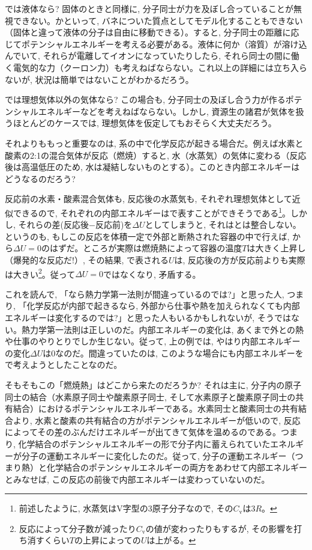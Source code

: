 では液体なら? 固体のときと同様に, 分子同士が力を及ぼし合っていることが無視できない。かといって, バネについた質点としてモデル化することもできない（固体と違って液体の分子は自由に移動できる）。すると, 分子同士の距離に応じてポテンシャルエネルギーを考える必要がある。液体に何か（溶質）が溶け込んでいて, それらが電離してイオンになっていたりしたら, それら同士の間に働く電気的な力（クーロン力）も考えねばならない。これ以上の詳細には立ち入らないが, 状況は簡単ではないことがわかるだろう。
\mv

では理想気体以外の気体なら? この場合も, 分子同士の及ぼし合う力が作るポテンシャルエネルギーなどを考えねばならない。しかし, 資源生の諸君が気体を扱うほとんどのケースでは, 理想気体を仮定してもおそらく大丈夫だろう。
\mv

それよりももっと重要なのは, 系の中で化学反応が起きる場合だ。例えば水素と酸素の2:1の混合気体が反応（燃焼）すると, 水（水蒸気）の気体に変わる（反応後は高温低圧のため, 水は凝結しないものとする）。このとき内部エネルギーはどうなるのだろう?

反応前の水素・酸素混合気体も, 反応後の水蒸気も, それぞれ理想気体として近似できるので, それぞれの内部エネルギーはで表すことができそうである\footnote{前述したように, 水蒸気はV字型の3原子分子なので, その$C_\text{v}$は$3R$。}。しかし, それらの差(反応後$-$反応前)を$\Delta U$としてしまうと, それはとは整合しない。というのも, もしこの反応を体積一定で外部と断熱された容器の中で行えば, から$\Delta U=0$のはずだ。ところが実際は燃焼熱によって容器の温度$T$は大きく上昇し（爆発的な反応だ!）, その結果, で表される$U$は, 反応後の方が反応前よりも実際は大きい\footnote{反応によって分子数が減ったり$C_\text{v}$の値が変わったりもするが, その影響を打ち消すくらい$T$の上昇によっての$U$は上がる。}。従って$\Delta U=0$ではなくなり, 矛盾する。
\mv

これを読んで, 「なら熱力学第一法則が間違っているのでは?」と思った人, つまり, 「化学反応が内部で起きるなら, 外部から仕事や熱を加えられなくても内部エネルギーは変化するのでは?」と思った人もいるかもしれないが, そうではない。熱力学第一法則は正しいのだ。内部エネルギーの変化は, あくまで外との熱や仕事のやりとりでしか生じない。従って, 上の例では, やはり内部エネルギーの変化$\Delta U$は0なのだ。間違っていたのは, このような場合にも内部エネルギーをで考えようとしたことなのだ。
\mv

そもそもこの「燃焼熱」はどこから来たのだろうか? それは主に, 分子内の原子同士の結合（水素原子同士や酸素原子同士, そして水素原子と酸素原子同士の共有結合）におけるポテンシャルエネルギーである。水素同士と酸素同士の共有結合より, 水素と酸素の共有結合の方がポテンシャルエネルギーが低いので, 反応によってその差のぶんだけエネルギーが出てきて気体を温めるのである。つまり, 化学結合のポテンシャルエネルギーの形で分子内に蓄えられていたエネルギーが分子の運動エネルギーに変化したのだ。従って, 分子の運動エネルギー（つまり熱）と化学結合のポテンシャルエネルギーの両方をあわせて内部エネルギーとみなせば, この反応の前後で内部エネルギーは変わっていないのだ。
\mv

